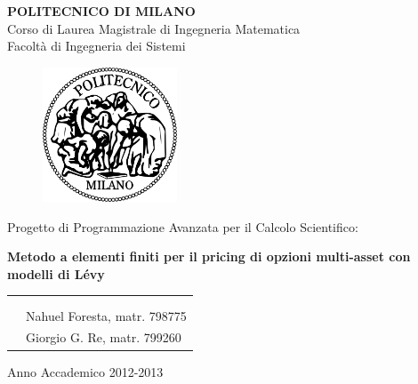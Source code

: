 \documentclass[a4paper,10pt]{report}
\theoremstyle{osservazione}
\theoremstyle{esempio}
\theoremstyle{notazione}
\theoremstyle{corollario}
\begin{document}
\thispagestyle{empty}

	\begin{center}
	 {\large{\textbf{POLITECNICO DI MILANO}\\
             Corso di Laurea Magistrale di Ingegneria Matematica\\
             Facolt\`a di Ingegneria dei Sistemi\\
             }}
	\end{center}

	\vspace{1cm}
	\begin{figure}[htbp]
	\begin{center}
	\includegraphics[width=4cm]{img/poli_logo.png}
	\end{center}
	\end{figure}
	
	\vspace{1cm}
	\begin{center}
	{\LARGE{Progetto di Programmazione Avanzata per il Calcolo Scientifico:}}
	\end{center}
	\vspace{2cm}
	\begin{center}
	{\LARGE{\textbf{Metodo a elementi finiti per il pricing di opzioni multi-asset con modelli di L\'evy}}}
	\end{center}
	
	\begin{table}[hb!]
	\begin{center}
	\begin{tabular}{p{8cm}p{7cm}}
	& \\
  	& \\
  	& {\large Nahuel Foresta, matr. 798775}\\
	& {\large Giorgio G. Re, matr. 799260}\\
	\end{tabular}
	\end{center}
	\end{table}
	\begin{center}
	\vspace{3cm}
	\large{Anno Accademico 2012-2013}
	\end{center}
\end{document}
